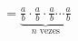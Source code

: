 \documentclass[preview]{standalone}
\begin{document}
\begin{align*}
= \underbrace{\frac{a}{b} \cdot \frac{a}{b} \cdot \frac{a}{b} \cdots \frac{a}{b}}_{n \text{ vezes}}
\end{align*}
\end{document}
